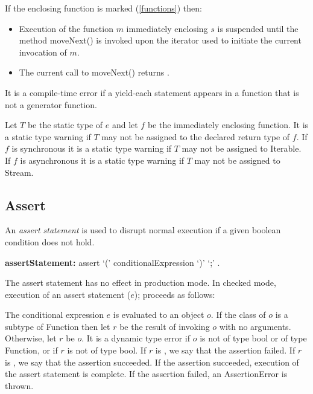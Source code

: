 \documentclass{article}
\newcommand{\code}[1]{{\sf #1}}
\begin{document}
\LMHash{}
If the enclosing function is marked \SYNC* (\ref{functions}) then:
\begin{itemize}
\item
Execution of the function $m$ immediately enclosing $s$ is suspended until the method \code{moveNext()} is invoked upon the iterator used to initiate the current invocation of $m$. 
\item
The current call to \code{moveNext()} returns \TRUE.
\end{itemize}

\LMHash{}
It is a compile-time error if a yield-each statement appears in a function that is not a generator function.

\LMHash{}
Let $T$ be the static type of $e$ and let $f$ be the immediately enclosing function.  It is a static type warning if $T$ may not be assigned to the declared return type of $f$.  If $f$ is synchronous it is a static  type warning if $T$ may not be assigned to \code{Iterable}.  If $f$ is asynchronous it is a static  type warning if $T$ may not be assigned to \code{Stream}. 


\subsection{ Assert}

\LMHash{}
An {\em assert statement} is used to disrupt normal execution if a given boolean condition does not hold.

\begin{grammar}
{\bf assertStatement:}
   assert `(' conditionalExpression `)' `{\escapegrammar ;}'
      .
\end{grammar}
      
\LMHash{}
The assert statement has no effect in production mode. In checked mode, execution of an assert statement \code{\ASSERT{}($e$);} proceeds as follows:

\LMHash{}
The conditional expression $e$ is evaluated to an object $o$. If the class of $o$ is a subtype of \code{Function} then let $r$ be the result of invoking $o$ with no arguments. Otherwise, let $r$ be $o$. 
It is a dynamic type error if $o$ is not of type \code{bool} or of type \code{Function}, or if $r$ is not of type \code{bool}.  If $r$ is \FALSE{}, we say that the assertion failed. If $r$ is \TRUE{}, we say that the assertion succeeded. If the assertion succeeded, execution of the assert statement is complete. If the assertion failed, an \code{AssertionError} is thrown.
\end{document}
